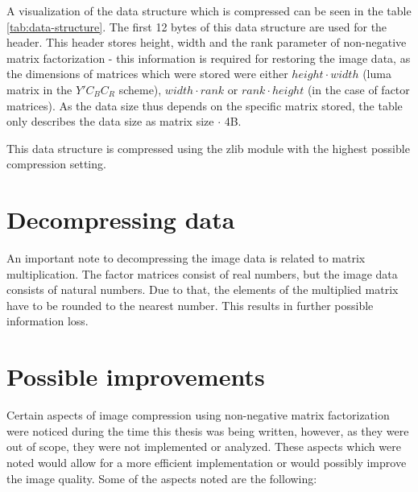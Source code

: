 \documentclass[thesis=M,english]{FITthesis}[2012/10/20]
\begin{document}
A visualization of the data structure which is compressed can be seen in the
table \ref{tab:data-structure}. The first 12 bytes of this data structure
are used for the header. This header stores height, width and the rank parameter
of non-negative matrix factorization - this information is required for restoring
the image data, as the dimensions of matrices which were stored were either
$height \cdot width$ (luma matrix in the $Y'C_BC_R$ scheme), $width \cdot rank$
or $rank \cdot height$ (in the case of factor matrices). As the data size thus
depends on the specific matrix stored, the table only describes the data size
as matrix size $\cdot$ 4B.

This data structure is compressed using the zlib module with the highest possible
compression setting.


\section{Decompressing data}
An important note to decompressing the image data is related to matrix multiplication.
The factor matrices consist of real numbers, but the image data consists of natural numbers.
Due to that, the elements of the multiplied matrix have to be rounded to the nearest number.
This results in further possible information loss.


\section{Possible improvements}
Certain aspects of image compression using non-negative matrix factorization
were noticed during the time this thesis was being written, however, as
they were out of scope, they were not implemented or analyzed. These
aspects which were noted would allow for a more efficient implementation
or would possibly improve the image quality. Some of the aspects
noted are the following:
\end{document}
